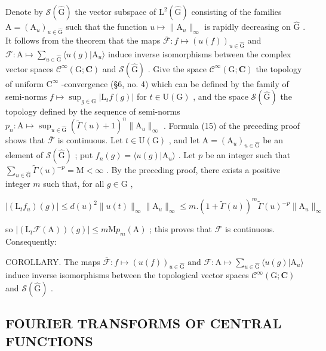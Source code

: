 Denote by \(\mathcal{S}(\hat{\mathrm{G}})\) the vector subspace of \(\mathrm{L}^2 (\hat{\mathrm{G}})\) consisting of the families \(\mathrm{A} = (\mathrm{A}_u)_{u\in \hat{\mathrm{G}}}\) such that the function \(u\mapsto \| \mathrm{A}_u\|_\infty\) is rapidly decreasing on \(\hat{\mathrm{G}}\) . It follows from the theorem that the maps \(\overline{\mathcal{F}}:f\mapsto (u(f))_{u\in \hat{\mathrm{G}}}\) and \(\mathcal{F}\colon \mathrm{A}\mapsto \sum_{u\in \hat{\mathrm{G}}}\langle u(g)|\mathrm{A}_u\rangle\) induce inverse isomorphisms between the complex vector spaces \(\mathcal{C}^\infty (\mathrm{G};\mathbf{C})\) and \(\mathcal{S}(\hat{\mathrm{G}})\) . Give the space \(\mathcal{C}^\infty (\mathrm{G};\mathbf{C})\) the topology of uniform \(\mathrm{C}^\infty\) -convergence (§6, no. 4) which can be defined by the family of semi-norms \(f\mapsto \sup_{g\in \mathrm{G}}|\mathrm{L}_t f(g)|\) for \(t\in \mathrm{U}(\mathrm{G})\) , and the space \(\mathcal{S}(\hat{\mathrm{G}})\) the topology defined by the sequence of semi-norms \(p_n:\mathrm{A}\mapsto \sup_{u\in \hat{\mathrm{G}}}(\tilde{\Gamma} (u) + 1)^n\| \mathrm{A}_u\|_\infty\) . Formula (15) of the preceding proof shows that \(\overline{\mathcal{F}}\) is continuous. Let \(t\in \mathrm{U}(\mathrm{G})\) , and let \(\mathrm{A} = (\mathrm{A}_u)_{u\in \hat{\mathrm{G}}}\) be an element of \(\mathcal{S}(\hat{\mathrm{G}})\) ; put \(f_{n}(g) = \langle u(g)|\mathrm{A}_{u}\rangle\) . Let \(p\) be an integer such that \(\sum_{u\in \hat{\mathrm{G}}} \tilde{\Gamma} (u)^{-p} = \mathrm{M} < \infty\) . By the preceding proof, there exists a positive integer \(m\) such that, for all \(g\in \mathrm{G}\) ,

\[
| (\mathrm{L} _ {t} f _ {u}) (g) | \leq d (u) ^ {2} \| u (t) \| _ {\infty} \| \mathrm{A} _ {u} \| _ {\infty} \leq m. (1 + \tilde {\Gamma} (u)) ^ {m} \tilde {\Gamma} (u) ^ {- p} \| \mathrm{A} _ {u} \| _ {\infty}
\]

so \(|(\mathrm{L}_t\mathcal{F}(\mathrm{A}))(g)| \leq m\mathrm{M}p_m(\mathrm{A})\) ; this proves that \(\mathcal{F}\) is continuous. Consequently:

COROLLARY. The maps \(\overline{\mathcal{F}}: f \mapsto (u(f))_{u \in \hat{\mathrm{G}}} \text{ and } \mathcal{F}: \mathrm{A} \mapsto \sum_{u \in \hat{\mathrm{G}}} \langle u(g) | \mathrm{A}_u \rangle\) induce inverse isomorphisms between the topological vector spaces \(\mathcal{C}^\infty(\mathrm{G}; \mathbf{C})\) and \(\mathcal{S}(\hat{\mathrm{G}})\) .

\subsection{FOURIER TRANSFORMS OF CENTRAL FUNCTIONS}

